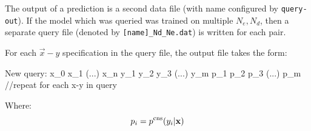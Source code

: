	The output of a prediction is a second data file (with name configured by \texttt{query-out}). If the model which was queried was trained on multiple $N_e, N_d$, then a separate query file (denoted by \texttt{[name]\_Nd\_Ne.dat}) is written for each pair.

	For each $\vec{x}-y$ specification in the query file, the output file takes the form:

	\begin{terminal}
New query: x_0 x_1 (...) x_n
y_1 y_2 y_3 (...) y_m
p_1 p_2 p_3 (...) p_m
//repeat for each x-y in query
\end{terminal}
	Where:
	\begin{equation}
		p_i = p^\text{cns}(y_i | \mathbf{\boldsymbol{\mathrm{x}}})
	\end{equation}
